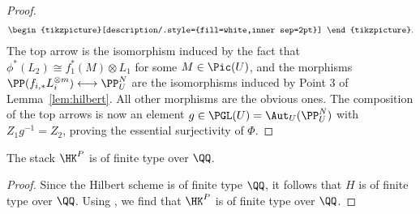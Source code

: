 \begin{proof}
\begin{equation*}
\begin{matrix}
\begin{tikzpicture}[description/.style={fill=white,inner sep=2pt}]
      \end{tikzpicture} \end{matrix} \textrm{.}
    \end{equation*}
The top arrow is the isomorphism induced by the fact that $\phi^*(L_2) \cong f_1^*(M) \otimes L_1$ for some $M \in \Pic(U)$, and the morphisms $\PP(f_{i,*} L^{\otimes m}_i) \longleftrightarrow \PP^N_U$ are the isomorphisms induced by Point $3$ of Lemma~\ref{lem:hilbert}. All other morphisms are the obvious ones. The composition of the top arrows is now an element $g \in \PGL(U) = \Aut_U(\PP^N_U)$ with $Z_1 g^{-1} = Z_2$, proving the essential surjectivity of $\Phi$.
\end{proof}

\begin{lemma}\label{lem:moduli_hilb_pol_ft}
The stack $\HK^P$ is of finite type over $\QQ$.
\end{lemma}
\begin{proof}
Since the Hilbert scheme is of finite type $\QQ$, it follows that $H$ is of finite type over $\QQ$. Using \cite[Tags~06U8, 050X]{SP}, we find that $\HK^P$ is of finite type over $\QQ$.
\end{proof}

